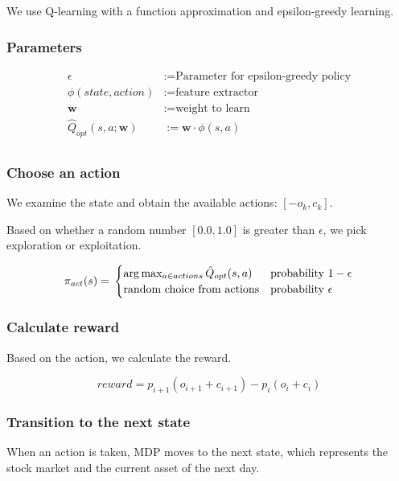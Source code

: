 \documentclass[twocolumn,10pt]{asme2ej}
\newcommand{\vect}[1]{\boldsymbol{#1}}
\begin{document}
We use Q-learning with a function approximation and epsilon-greedy
learning.

\subsubsection*{Parameters}

\begin{align*}
  \epsilon &:= \text{Parameter for epsilon-greedy policy} \\
  \phi(state,action) &:= \text{feature extractor} \\
  \vect{w} &:= \text{weight to learn} \\
  \hat{Q}_{opt}(s, a; \vect{w}) &:= \vect{w} \cdot \phi(s, a) \\
\end{align*}


\subsubsection*{Choose an action}

We examine the state and obtain the available actions: $[-o_k,c_k]$.

Based on whether a random number $[0.0, 1.0]$ is greater than
$\epsilon$, we pick exploration or exploitation.

\[
  \pi_{act}(s) = \\
  \begin{cases}
    \arg \max_{a \in actions}\hat{Q}_{opt}(s, a) & \text{probability } 1-\epsilon \\
    \text{random choice from actions} & \text{probability } \epsilon \\
  \end{cases}
\]


\subsubsection*{Calculate reward}

Based on the action, we calculate the reward.

\[
  reward = p_{i+1}(o_{i+1} + c_{i+1}) - p_{i}(o_{i} + c_{i})
\]

\subsubsection*{Transition to the next state}

When an action is taken, MDP moves to the next state, which represents
the stock market and the current asset of the next day.
\end{document}
